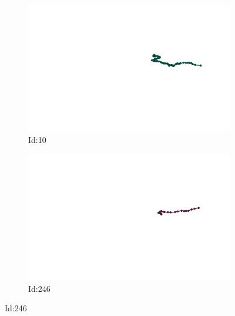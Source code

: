 \documentclass[12pt,twoside]{report}
\begin{document}
\begin{figure}
\centering
\begin{subfigure}[b]{0.20\textwidth}
\centering
\includegraphics[width=\textwidth]{../../trajectories/10.png}
\caption{Id:10}
\end{subfigure}
\begin{subfigure}[b]{0.20\textwidth}
\centering
\includegraphics[width=\textwidth]{../../trajectories/246.png}
\caption{Id:246}
\end{subfigure}
\end{figure}
\end{document}
